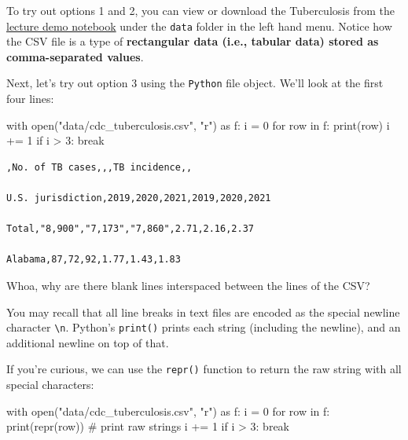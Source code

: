 \documentclass[
  letterpaper,
  DIV=11,
  numbers=noendperiod]{scrreprt}
\newenvironment{Shaded}{\begin{snugshade}}{\end{snugshade}}
\newcommand{\BuiltInTok}[1]{\textcolor[rgb]{0.00,0.23,0.31}{#1}}
\newcommand{\CommentTok}[1]{\textcolor[rgb]{0.37,0.37,0.37}{#1}}
\newcommand{\ControlFlowTok}[1]{\textcolor[rgb]{0.00,0.23,0.31}{#1}}
\newcommand{\DecValTok}[1]{\textcolor[rgb]{0.68,0.00,0.00}{#1}}
\newcommand{\ImportTok}[1]{\textcolor[rgb]{0.00,0.46,0.62}{#1}}
\newcommand{\KeywordTok}[1]{\textcolor[rgb]{0.00,0.23,0.31}{#1}}
\newcommand{\NormalTok}[1]{\textcolor[rgb]{0.00,0.23,0.31}{#1}}
\newcommand{\OperatorTok}[1]{\textcolor[rgb]{0.37,0.37,0.37}{#1}}
\newcommand{\StringTok}[1]{\textcolor[rgb]{0.13,0.47,0.30}{#1}}
\begin{document}
To try out options 1 and 2, you can view or download the Tuberculosis
from the
\href{https://data100.datahub.berkeley.edu/hub/user-redirect/git-pull?repo=https\%3A\%2F\%2Fgithub.com\%2FDS-100\%2Ffa23-student&urlpath=lab\%2Ftree\%2Ffa23-student\%2Flecture\%2Flec05\%2Flec04-eda.ipynb&branch=main}{lecture
demo notebook} under the \texttt{data} folder in the left hand menu.
Notice how the CSV file is a type of \textbf{rectangular data (i.e.,
tabular data) stored as comma-separated values}.

Next, let's try out option 3 using the \texttt{Python} file object.
We'll look at the first four lines:

\begin{Shaded}
\begin{Highlighting}[]
\ControlFlowTok{with} \BuiltInTok{open}\NormalTok{(}\StringTok{"data/cdc\_tuberculosis.csv"}\NormalTok{, }\StringTok{"r"}\NormalTok{) }\ImportTok{as}\NormalTok{ f:}
\NormalTok{    i }\OperatorTok{=} \DecValTok{0}
    \ControlFlowTok{for}\NormalTok{ row }\KeywordTok{in}\NormalTok{ f:}
        \BuiltInTok{print}\NormalTok{(row)}
\NormalTok{        i }\OperatorTok{+=} \DecValTok{1}
        \ControlFlowTok{if}\NormalTok{ i }\OperatorTok{\textgreater{}} \DecValTok{3}\NormalTok{:}
            \ControlFlowTok{break}
\end{Highlighting}
\end{Shaded}

\begin{verbatim}
,No. of TB cases,,,TB incidence,,

U.S. jurisdiction,2019,2020,2021,2019,2020,2021

Total,"8,900","7,173","7,860",2.71,2.16,2.37

Alabama,87,72,92,1.77,1.43,1.83
\end{verbatim}

Whoa, why are there blank lines interspaced between the lines of the
CSV?

You may recall that all line breaks in text files are encoded as the
special newline character \texttt{\textbackslash{}n}. Python's
\texttt{print()} prints each string (including the newline), and an
additional newline on top of that.

If you're curious, we can use the \texttt{repr()} function to return the
raw string with all special characters:

\begin{Shaded}
\begin{Highlighting}[]
\ControlFlowTok{with} \BuiltInTok{open}\NormalTok{(}\StringTok{"data/cdc\_tuberculosis.csv"}\NormalTok{, }\StringTok{"r"}\NormalTok{) }\ImportTok{as}\NormalTok{ f:}
\NormalTok{    i }\OperatorTok{=} \DecValTok{0}
    \ControlFlowTok{for}\NormalTok{ row }\KeywordTok{in}\NormalTok{ f:}
        \BuiltInTok{print}\NormalTok{(}\BuiltInTok{repr}\NormalTok{(row)) }\CommentTok{\# print raw strings}
\NormalTok{        i }\OperatorTok{+=} \DecValTok{1}
        \ControlFlowTok{if}\NormalTok{ i }\OperatorTok{\textgreater{}} \DecValTok{3}\NormalTok{:}
            \ControlFlowTok{break}
\end{Highlighting}
\end{Shaded}
\end{document}
